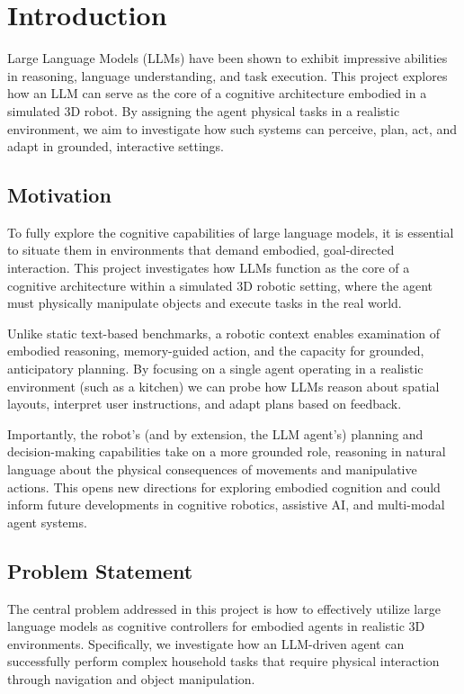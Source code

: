\documentclass[../report.tex]{subfiles}
\begin{document}
\section{Introduction}
\label{sec:introduction}

Large Language Models (LLMs) have been shown to exhibit impressive abilities in reasoning, language understanding, and task execution. This project explores how an LLM can serve as the core of a cognitive architecture embodied in a simulated 3D robot. By assigning the agent physical tasks in a realistic environment, we aim to investigate how such systems can perceive, plan, act, and adapt in grounded, interactive settings.

\subsection{Motivation}
\label{sec:introduction:motivation}

To fully explore the cognitive capabilities of large language models, it is essential to situate them in environments that demand embodied, goal-directed interaction. This project investigates how LLMs function as the core of a cognitive architecture within a simulated 3D robotic setting, where the agent must physically manipulate objects and execute tasks in the real world.

Unlike static text-based benchmarks, a robotic context enables examination of embodied reasoning, memory-guided action, and the capacity for grounded, anticipatory planning. By focusing on a single agent operating in a realistic environment (such as a kitchen) we can probe how LLMs reason about spatial layouts, interpret user instructions, and adapt plans based on feedback.

Importantly, the robot's (and by extension, the LLM agent's) planning and decision-making capabilities take on a more grounded role, reasoning in natural language about the physical consequences of movements and manipulative actions. This opens new directions for exploring embodied cognition and could inform future developments in cognitive robotics, assistive AI, and multi-modal agent systems.

\subsection{Problem Statement}
\label{sec:introduction:problem_statement}

The central problem addressed in this project is how to effectively utilize large language models as cognitive controllers for embodied agents in realistic 3D environments. Specifically, we investigate how an LLM-driven agent can successfully perform complex household tasks that require physical interaction through navigation and object manipulation.
\end{document}
